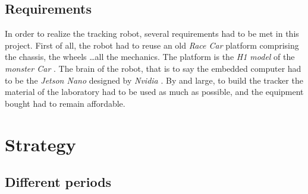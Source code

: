 		\subsection{Requirements}
		
		In order to realize the tracking robot, several requirements had to be met in this
		project. First of all, the robot had to reuse an old \textit{Race Car} platform comprising
		the chassis, the wheels \dots all the mechanics. The platform is the \textit{H1 model}
		of the \textit{monster Car} \cite{datasheet}.
		The brain of the robot, that is to say 
		the embedded computer had to be the \textit{Jetson Nano} designed by \textit{Nvidia} \cite{nano}. By and
		large, to build the tracker the material of the laboratory had to be used as much as 
		possible, and the equipment bought had to remain affordable.
	
	\section{Strategy}
	
		\subsection{Different periods}

